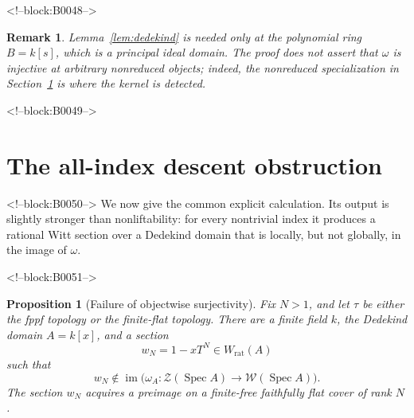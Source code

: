 \documentclass[11pt]{article}
\newtheorem{proposition}[theorem]{Proposition}
\newtheorem{remark}[theorem]{Remark}
\theoremstyle{definition}
\newcommand{\Spec}{\operatorname{Spec}}
\newcommand{\Wrat}{W_{\mathrm{rat}}}
\newcommand{\Zsh}{\mathcal Z}
\newcommand{\Wsh}{\mathcal W}
\begin{document}
<!--block:B0048-->
\begin{remark}\label{rem:scope-site}
Lemma~\ref{lem:dedekind} is needed only at the polynomial ring
\(B=k[s]\), which is a principal ideal domain.  The proof does not assert
that \(\omega\) is injective at arbitrary nonreduced objects; indeed, the
nonreduced specialization in Section~\ref{sec:obstruction} is where the
kernel is detected.
\end{remark}

<!--block:B0049-->
\section{The all-index descent obstruction}\label{sec:obstruction}

<!--block:B0050-->
We now give the common explicit calculation.  Its output is slightly
stronger than nonliftability: for every nontrivial index it produces a
rational Witt section over a Dedekind domain that is locally, but not
globally, in the image of \(\omega\).

<!--block:B0051-->
\begin{proposition}[Failure of objectwise surjectivity]\label{prop:failure}
Fix \(N>1\), and let \(\tau\) be either the fppf topology or the
finite-flat topology.  There are a finite field \(k\), the Dedekind domain
\(A=k[x]\), and a section
\[
 w_N=1-xT^N\in\Wrat(A)
\]
such that
\[
 w_N\notin
 \operatorname{im}\bigl(\omega_A\colon
 \Zsh(\Spec A)\longrightarrow\Wsh(\Spec A)\bigr).
\]
The section \(w_N\) acquires a preimage on a finite-free faithfully flat
cover of rank \(N\).
\end{proposition}
\end{document}
